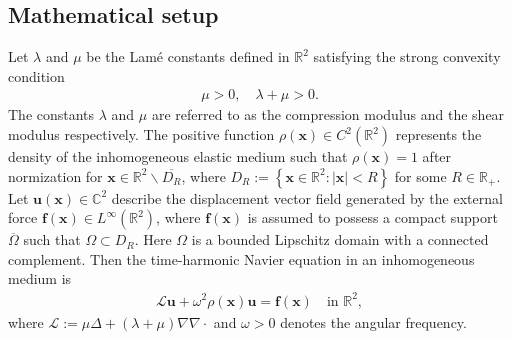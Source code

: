 \documentclass[11pt,reqno,oneside]{amsart}
\theoremstyle{definition}
\theoremstyle{remark}
\numberwithin{equation}{section}
\numberwithin{equation}{section}
\theoremstyle{remark}
\begin{document}

\subsection{Mathematical setup} 

Let $ \lambda $ and $ \mu $ be the Lam\'e constants defined in $\mathbb R^2$ satisfying the strong convexity condition 
\begin{align} \label{ineq_introduction_strong_convexity_condition}
	\mu > 0, \quad \lambda + \mu > 0.
\end{align}
The constants $ \lambda $ and $ \mu $ are referred to as the compression modulus and the shear modulus respectively. The positive function $ \rho\left(\mathbf{x}\right)\in C^2\left(\mathbb{R}^2\right) $ represents the density of the inhomogeneous elastic medium such that $ \rho\left(\mathbf{x}\right)=1 $ after normization for $ \mathbf{x}\in\mathbb{R}^2 \backslash \overline{D_R} $, where  $D_R:=\left\{\mathbf{x} \in \mathbb{R}^2:\left| \mathbf{x} \right| < R\right\} $ for some $R\in \mathbb R_+$.  Let $ \mathbf{u}\left(\mathbf{x}\right)\in\mathbb{C}^2 $ describe the displacement vector field generated by the external force $ \mathbf{f}\left(\mathbf{x}\right)\in L^{\infty}\left(\mathbb{R}^2\right) $, where   $\mathbf{f}\left(\mathbf{x}\right)$  is assumed to possess a compact support $ \overline{\Omega} $ such that $ \Omega\subset D_R$. Here  $\Omega$ is a bounded Lipschitz domain with a connected complement. Then the time-harmonic Navier equation in an inhomogeneous medium is
\begin{align} \label{model_global_non-nested_R2}
	\mathcal{L} \mathbf{u}+\omega^2 \rho\left(\mathbf{x}\right) \mathbf{u}=\mathbf{f}\left(\mathbf{x}\right) \quad\text{in } \mathbb{R}^2,  
\end{align}
where $ \mathcal{L} := \mu \Delta + \left(\lambda+\mu\right) \nabla \nabla \cdot$ and  $ \omega > 0 $ denotes the angular frequency. 
\end{document}
